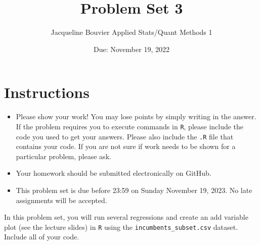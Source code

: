 \documentclass[12pt,letterpaper]{article}
\title{Problem Set 3}
\date{Due: November 19, 2022}
\author{Jacqueline Bouvier Applied Stats/Quant Methods 1}
\begin{document}
	\maketitle
	\section*{Instructions}
	\begin{itemize}
		\item Please show your work! You may lose points by simply writing in the answer. If the problem requires you to execute commands in \texttt{R}, please include the code you used to get your answers. Please also include the \texttt{.R} file that contains your code. If you are not sure if work needs to be shown for a particular problem, please ask.
	\item Your homework should be submitted electronically on GitHub.
	\item This problem set is due before 23:59 on Sunday November 19, 2023. No late assignments will be accepted.

	\end{itemize}

		\vspace{.25cm}
	
\noindent In this problem set, you will run several regressions and create an add variable plot (see the lecture slides) in \texttt{R} using the \texttt{incumbents\_subset.csv} dataset. Include all of your code.

	\vspace{.5cm}
\end{document}
